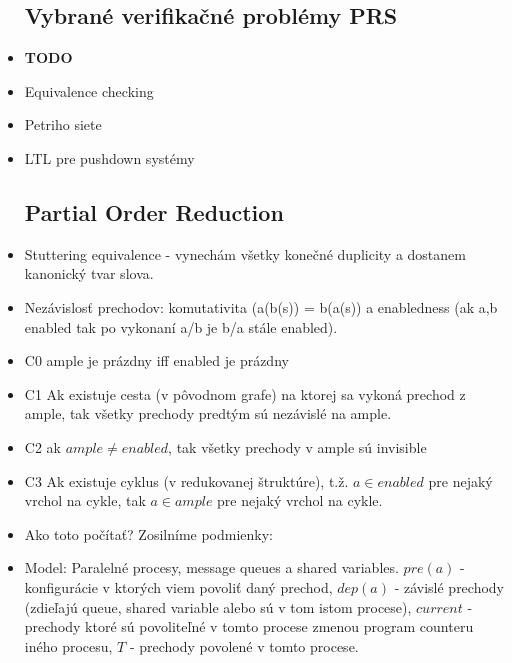 \documentclass[paper=a4, fontsize=11pt]{scrartcl} %
\numberwithin{equation}{section} %
\numberwithin{figure}{section} %
\numberwithin{table}{section} %
\begin{document}
\begin{itemize}
	\subsection{Vybrané verifikačné problémy PRS}
	
	\item \textbf{TODO}
	
	\item Equivalence checking
	
	\item Petriho siete
	
	\item LTL pre pushdown systémy
	
	\subsection{Partial Order Reduction}
	
	\item Stuttering equivalence - vynechám všetky konečné duplicity a dostanem kanonický tvar slova.
	
	\item Nezávislosť prechodov: komutativita (a(b(s)) = b(a(s)) a enabledness (ak a,b enabled tak po vykonaní a/b je b/a stále enabled).
	
	\item C0 ample je prázdny iff enabled je prázdny
	
	\item C1 Ak existuje cesta (v pôvodnom grafe) na ktorej sa vykoná prechod z ample, tak všetky prechody predtým sú nezávislé na ample.
	
	\item C2 ak $ample \not= enabled$, tak všetky prechody v ample sú invisible
	
	\item C3 Ak existuje cyklus (v redukovanej štruktúre), t.ž. $a \in enabled$ pre nejaký vrchol na cykle, tak $a \in ample$ pre nejaký vrchol na cykle.
	
	\item Ako toto počítať? Zosilníme podmienky:
	
	\item Model: Paralelné procesy, message queues a shared variables. $pre(a)$ - konfigurácie v ktorých viem povoliť daný prechod, $dep(a)$ - závislé prechody (zdieľajú queue, shared variable alebo sú v tom istom procese), $current$ - prechody ktoré sú povoliteľné v tomto procese zmenou program counteru iného procesu, $T$ - prechody povolené v tomto procese.
	

\end{itemize}
\end{document}
